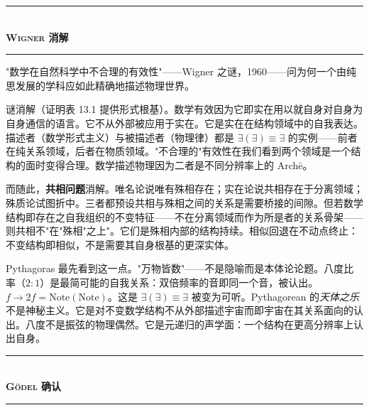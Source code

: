 \documentclass[10pt, openany, oneside]{book}
\renewcommand{\normalsize}{\fontsize{10}{13}\selectfont}
\begin{document}

\begin{center}
    \rule{0.3\textwidth}{0.4pt}\\[0.5em]
    {\normalsize\bfseries\scshape Wigner 消解}\\[0.3em]
    \rule{0.3\textwidth}{0.4pt}
\end{center}

\vspace{1em}

\noindent "数学在自然科学中不合理的有效性"——Wigner 之谜，1960——问为何一个由纯思发展的学科应如此精确地描述物理世界。

谜消解（证明表 13.1 提供形式根基）。数学有效因为它即实在用以就自身对自身为自身通信的语言。它不从外部被应用于实在。它是实在在结构领域中的自我表达。描述者（数学形式主义）与被描述者（物理律）都是 $\exists(\exists) \equiv \exists$ 的实例——前者在纯关系领域，后者在物质领域。"不合理的"有效性在我们看到两个领域是一个结构的面时变得合理。数学描述物理因为二者是不同分辨率上的 Arch\={e}。

而随此，\textbf{共相问题}消解。唯名论说唯有殊相存在；实在论说共相存在于分离领域；殊质论试图折中。三者都预设共相与殊相之间的关系是需要桥接的间隙。但若数学结构即存在之自我组织的不变特征——不在分离领域而作为所是者的关系骨架——则共相不"在"殊相"之上"。它们是殊相内部的结构持续。相似回退在不动点终止：不变结构即相似，不是需要其自身根基的更深实体。

Pythagoras 最先看到这一点。"万物皆数"——不是隐喻而是本体论论题。八度比率（$2:1$）是最简可能的自我关系：双倍频率的音即同一个音，被认出。$f \to 2f = \text{Note}(\text{Note})$。这是 $\exists(\exists) \equiv \exists$ 被变为可听。Pythagorean 的\textit{天体之乐}不是神秘主义。它是对不变数学结构不从外部描述宇宙而即宇宙在其关系面向的认出。八度不是振弦的物理偶然。它是元递归的声学面：一个结构在更高分辨率上认出自身。

\vspace{1.5em}


\begin{center}
    \rule{0.3\textwidth}{0.4pt}\\[0.5em]
    {\normalsize\bfseries\scshape G\"{o}del 确认}\\[0.3em]
    \rule{0.3\textwidth}{0.4pt}
\end{center}
\end{document}
